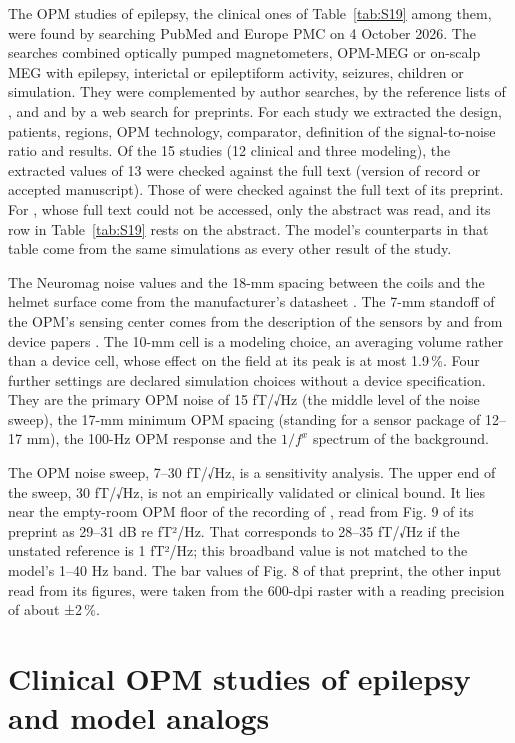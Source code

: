 \documentclass[preprint,12pt,authoryear,a4paper]{elsarticle}
\begin{document}
The OPM studies of epilepsy, the clinical ones of Table~\ref{tab:S19} among them, were found by searching PubMed and Europe PMC on 4 October 2026. The searches combined optically pumped magnetometers, OPM-MEG or on-scalp MEG with epilepsy, interictal or epileptiform activity, seizures, children or simulation. They were complemented by author searches, by the reference lists of \citet{feys2025}, \citet{schwartz2025} and \citet{shen2026} and by a web search for preprints. For each study we extracted the design, patients, regions, OPM technology, comparator, definition of the signal-to-noise ratio and results. Of the 15 studies (12 clinical and three modeling), the extracted values of 13 were checked against the full text (version of record or accepted manuscript). Those of \citet{feys2022} were checked against the full text of its preprint. For \citet{ren2025}, whose full text could not be accessed, only the abstract was read, and its row in Table~\ref{tab:S19} rests on the abstract. The model's counterparts in that table come from the same simulations as every other result of the study.

The Neuromag noise values and the 18-mm spacing between the coils and the helmet surface come from the manufacturer's datasheet \citep{elekta_triux}. The 7-mm standoff of the OPM's sensing center comes from the description of the sensors by \citet{jas2026} and from device papers \citep{alem2023,osborne2018}. The 10-mm cell is a modeling choice, an averaging volume rather than a device cell, whose effect on the field at its peak is at most 1.9\,\%. Four further settings are declared simulation choices without a device specification. They are the primary OPM noise of 15 fT/√Hz (the middle level of the noise sweep), the 17-mm minimum OPM spacing (standing for a sensor package of 12–17 mm), the 100-Hz OPM response and the $1/f^{x}$ spectrum of the background.

The OPM noise sweep, 7–30 fT/√Hz, is a sensitivity analysis. The upper end of the sweep, 30 fT/√Hz, is not an empirically validated or clinical bound. It lies near the empty-room OPM floor of the recording of \citet{jas2026}, read from Fig. 9 of its preprint as 29–31 dB re fT²/Hz. That corresponds to 28–35 fT/√Hz if the unstated reference is 1 fT²/Hz; this broadband value is not matched to the model's 1–40 Hz band. The bar values of Fig. 8 of that preprint, the other input read from its figures, were taken from the 600-dpi raster with a reading precision of about ±2\,\%.

\section{Clinical OPM studies of epilepsy and model analogs}\label{sec:S9}
\end{document}
